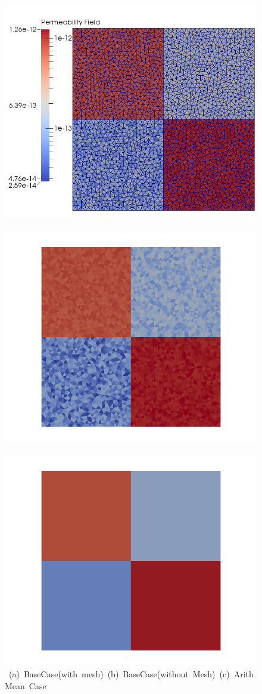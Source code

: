 \clearpage



\begin{landscape}
\begin{figure}[ht] 
\vbox{\vspace{-1cm}
\hbox{\includegraphics[width=.56\textwidth]{./Pics/BaseCase/BaseCase_PermField_withMesh.png}
      \includegraphics[width=.56\textwidth]{./Pics/BaseCase/BaseCase_PermField_withoutMesh2.png}
      \includegraphics[width=.56\textwidth]{./Pics/ArithMeanCase/ArithMeanCase_PermField_withoutMesh2.png}}
\vspace{0.cm}
\hbox{\hspace{0.5cm} (a) BaseCase(with mesh) \hspace{3.75cm} (b) BaseCase(without Mesh) \hspace{3.0cm} (c) ArithMean Case}
}
\end{figure}
\end{landscape}
